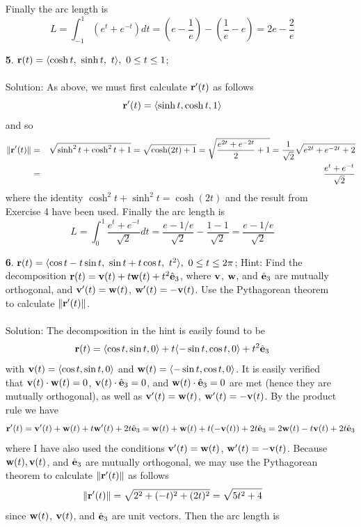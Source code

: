 \documentclass[12pt]{amsbook}
\newcommand{\la}{\langle}
\newcommand{\ra}{\rangle}
\begin{document}
\begin{enumerate}
   Finally the arc length is
  $$L=\int_{-1}^1 (e^t+e^{-t})dt=(e-\frac{1}{e})-(\frac{1}{e}-e)=2e-\frac{2}{e}$$
  \item[{\small\bf 5}.] ${\bf r}(t)=\la \cosh t,\ \sinh t,\ t \ra, \ 0 \leq t \leq 1$;
  \\
  \\
  {\sc Solution}: As above, we must first calculate ${\bf r}'(t)$ as follows
  $${\bf r}'(t)=\la \sinh t, \cosh t, 1 \ra$$
  and so 
  \begin{eqnarray*}
  \|{\bf r}'(t)\|&=&\sqrt{\sinh^2 t + \cosh^2 t+1}=\sqrt{\cosh(2t)+1}=\sqrt{\frac{e^{2t}+e^{-2t}}{2}+1}=\frac{1}{\sqrt{2}}\sqrt{e^{2t}+e^{-2t}+2}\\
  &=&\frac{e^t+e^{-t}}{\sqrt{2}}
  \end{eqnarray*}  
  where the identity $\cosh^2 t+\sinh^2 t=\cosh(2t)$ and the result from Exercise 4 have been used.
   Finally the arc length is
  $$L=\int_{0}^1 \frac{e^t+e^{-t}}{\sqrt{2}} dt=\frac{e-1/e}{\sqrt{2}}-\frac{1-1}{\sqrt{2}}=\frac{e-1/e}{\sqrt{2}}$$
  \item[{\small\bf 6}.] ${\bf r}(t)=\la \cos t -t\sin t,\ \sin t+t\cos t ,\ t^2 \ra, \ 0 \leq t \leq 2\pi $; Hint: Find the decomposition ${\bf r}(t)={\bf v}(t)+t{\bf w}(t)+t^2\hat{\bf e}_3$, where ${\bf v}$, ${\bf w}$, and $\hat{\bf e}_3$ are mutually orthogonal, and ${\bf v}'(t)={\bf w}(t)$, ${\bf w}'(t)=-{\bf v}(t)$. Use the Pythagorean theorem to calculate $\|{\bf r}'(t)\|$. 
  \\
  \\
  {\sc Solution}: The decomposition in the hint is easily found to be
  $${\bf r}(t)=\la \cos t, \sin t, 0  \ra + t\la - \sin t, \cos t, 0 \ra +t^2 \hat{\bf e}_3$$
  with ${\bf v}(t)=\la \cos t, \sin t, 0  \ra$ and ${\bf w}(t)=\la - \sin t, \cos t, 0 \ra$. It is easily verified that ${\bf v}(t)\cdot {\bf w}(t)=0$, ${\bf v}(t)\cdot \hat{\bf e}_3=0$, and ${\bf w}(t)\cdot \hat{\bf e}_3=0$ are met (hence they are mutually orthogonal), as well as ${\bf v}'(t)={\bf w}(t)$, ${\bf w}'(t)=-{\bf v}(t)$. By the product rule we have
  $${\bf r}'(t)={\bf v}'(t)+{\bf w}(t)+t{\bf w}'(t)+2t\hat{\bf e}_3={\bf w}(t)+{\bf w}(t)+t(-{\bf v}(t))+2t\hat{\bf e}_3=2{\bf w}(t)-t{\bf v}(t)+2t\hat{\bf e}_3$$
  where I have also used the conditions ${\bf v}'(t)={\bf w}(t)$, ${\bf w}'(t)=-{\bf v}(t)$. Because ${\bf w}(t), {\bf v}(t)$, and $\hat{\bf e}_3$ are mutually orthogonal, we may use the Pythagorean theorem to calculate $\|{\bf r}'(t)\|$ as follows
  $$\|{\bf r}'(t)\|=\sqrt{2^2+(-t)^2+(2t)^2}=\sqrt{5t^2+4}$$
  since ${\bf w}(t)$, ${\bf v}(t)$, and $\hat{\bf e}_3$ are unit vectors. Then the arc length is 

\end{enumerate}
\end{document}
